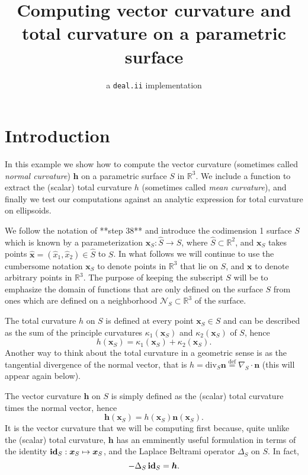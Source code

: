 \documentclass[10pt]{article}
\title{Computing vector curvature and total curvature on a parametric surface}
\author{a  \texttt{deal.ii} implementation}
\date{ }
\newcommand{\R}{\mathbb{R}}
\newcommand{\mbf}[1]{\boldsymbol{#1}}
\begin{document}
\maketitle


\section*{Introduction}

In this example we show how to compute the vector curvature (sometimes called
\emph{normal curvature}) $\mbf{h}$ on a parametric surface $S$ in $\R^3$.
We include a function to extract the (scalar) total curvature $h$ (sometimes
called \emph{mean curvature}), and finally we test our computations against an
analytic expression for total curvature on ellipsoids.  

We follow the notation of **step 38** and introduce the codimension 1 surface
$S$ which is known by a parameterization $\mbf{x}_{S}: \hat{S} \to S$, where
$\hat{S} \subset \R^2$, and $\mbf{x}_S$ takes points $\hat{\mbf{x}} =
(\hat{x}_1, \hat{x}_2) \in \hat{S}$ to $S$.  In what follows we will continue
to use the cumbersome notation $\mbf{x}_S$ to denote points in $\R^3$ that lie
on $S$, and $\mbf{x}$ to denote arbitrary points in $\R^3$.  The purpose of
keeping the subscript $S$ will be to emphasize the domain of functions that are only defined on the surface
$S$ from ones which are defined on a neighborhood $\mathcal{N}_S \subset \R^3$ of
the surface.

The total curvature $h$ on $S$ is defined at every point
$\mbf{x}_S \in S$ and can be described as the sum of the principle curvatures
$\kappa_1(\mbf{x}_S)$ and $\kappa_2(\mbf{x}_S)$ of $S$, hence 
\[h(\mbf{x}_S) =  \kappa_1(\mbf{x}_S) + \kappa_2(\mbf{x}_S).\]
Another way to think about the total curvature in a geometric sense is as the
tangential divergence of the normal vector, that is $h = \text{div}_{S}
\mbf{n} \overset{\text{def}}{=} \nabla_S \cdot \mbf{n}$  (this will appear again below).

The vector curvature $\mbf{h}$ on $S$ is simply defined as the (scalar) total
curvature times the normal vector, hence \[\mbf{h}(\mbf{x}_S) =
h(\mbf{x}_S)\mbf{n}(\mbf{x}_S).\]   It is the vector curvature that we will be
computing first because, quite unlike the (scalar) total curvature, $\mbf{h}$
has an emminently useful formulation in terms of the identity $\text{\bf id}_S
: \mbf{x}_S \mapsto \mbf{x}_S$, and the Laplace Beltrami operator $\Delta_S$ on
$S$.  In fact, 
\[ - \Delta_S \, \text{\bf id}_S = \mbf{h}.\]
\end{document}
